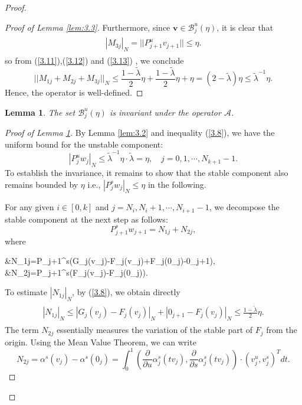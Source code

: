 \documentclass[12pt]{article}
\newtheorem{lemma}{Lemma}[section]
\begin{document}
\begin{proof}
\begin{proof}[Proof of Lemma \ref{lem:3.3}]
		Furthermore, since $ \boldsymbol{v}\in\mathcal{B}_{j}^{u}(\eta) $, it is clear that
		\begin{align}\label{3.13}
			\begin{split}
				|M_{3j}|_{N}=||P_{j+1}^{u}v_{j+1}||\leqslant\eta.
			\end{split}
		\end{align}
		so from (\ref{3.11}),(\ref{3.12}) and (\ref{3.13}) , we conclude
		$$
		||M_{1j}+M_{2j}+M_{3j}||_{N}\leqslant \frac{1-\widetilde\lambda}{2}\eta+\frac{1-\widetilde\lambda}{2}\eta+\eta=(2-\widetilde\lambda)\eta\leqslant\widetilde\lambda^{-1}\eta.
		$$
		Hence, the operator is well-defined.
	\end{proof}
	\begin{lemma}\label{lem:3.4}
		The set  $ \mathcal{B}_{j}^{u}(\eta) $ is invariant under the operator $\mathcal{A}   $.
	\end{lemma}
	\begin{proof}[Proof of Lemma \ref{lem:3.4}]
		By Lemma \ref{lem:3.2} and inequality (\ref{3.8}), we have the uniform bound for the unstable component:
		$$
		|P_{j}^{u}w_{j}|_{N}\leqslant \widetilde\lambda^{-1}\eta\cdot\widetilde\lambda=\eta,\quad j=0,1,\cdots,N_{k+1}-1.
		$$
		To establish the invariance, it remains to show​ that the stable component also remains bounded by $ \eta $ i.e., $ |P_{j}^{s}w_{j}|_{N}\leqslant\eta $ in the following.
		
		For any given $ i\in [0,k] $ and $ j=N_{i},N_{i}+1,\cdots,N_{i+1}-1 $, we decompose the stable component at the next step as follows:
		$$
		P_{j+1}^{s}w_{j+1}=N_{1j}+N_{2j},
		$$
		where
		\begin{flalign}\label{3.14}
			\begin{split}
				&N_{1j}=P_{j+1}^{s}(G_{j}(v_{j})-F_{j}(v_{j})+F_{j}(0_{j})-0_{j+1}),  \\
				&N_{2j}=P_{j+1}^{s}(F_{j}(v_{j})-F_{j}(0_{j})). \\
			\end{split}
		\end{flalign} 
		To estimate $ |N_{1j}|_{N} $, by (\ref{3.8}),  we obtain directly
		\begin{align} \label{3.15}
			\begin{split}
				|N_{1j}|_{N}\leqslant|G_{j}(v_{j})-F_{j}(v_{j})|_{N}+|0_{j+1}-F_{j}(v_{j})|_{N}\leqslant\frac{1-\widetilde\lambda}{2}\eta.
			\end{split}
		\end{align}
		The term $ N_{2j} $ essentially measures the variation of the stable part of $ F_{j} $ from the origin. Using the Mean Value Theorem, we can write
		$$
		N_{2j}=\alpha^{s}(v_{j})-\alpha^{s}(0_{j})=\int_{0}^{1}(\frac{\partial}{\partial u}\alpha_{j}^{s}(tv_{j}),\frac{\partial}{\partial s}\alpha_{j}^{s}(tv_{j}))\cdot (v_{j}^{u},v_{j}^{s})^{T}dt.
		$$
		

\end{proof}
\end{proof}
\end{document}
